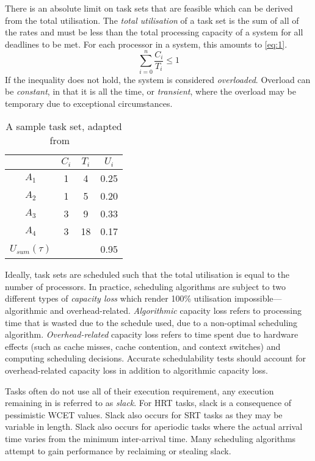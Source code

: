 There is an absolute limit on task sets that are feasible which can be derived from the total
utilisation. 
The \emph{total utilisation} of a task set is the sum of all of the rates and must be less than the
total processing capacity of a system for all deadlines to be met.
For each processor in a system, this amounts to \cref{eq:1}.
\begin{equation}
    \label{eq:1}
	\sum\limits_{i=0}^n \dfrac{C_{i}}{T_{i}} \leq 1
\end{equation}
If the inequality does not hold, the system is considered \emph{overloaded}. Overload
can be \emph{constant}, in that it is all the time, or \emph{transient}, where the overload may be
temporary due to exceptional circumstances.

\begin{table}
    \centering
    \begin{tabular}{cccc} \toprule
        & \emph{$C_{i}$} & $T_{i}$ & $U_{i} $ \\ \midrule
			$ A_{1}$ & 1 & 4 & 0.25 \\
			$ A_{2}$ & 1 & 5 & 0.20 \\
			$ A_{3}$ & 3 & 9 & 0.33 \\
			$ A_{4}$ & 3 & 18 & 0.17  \\\midrule 
	$ U_{sum}(\tau)$ & &  & 0.95 \\ \bottomrule
	\end{tabular}
	\caption{A sample task set, adapted from ~\citep{Brandenburg:phd}}
	\label{tab:example_task_set}
\end{table}

Ideally, task sets are scheduled such that the total utilisation is equal to the number of
processors.  In practice, scheduling algorithms are subject to two different types of \emph{capacity
loss} which render 100\% utilisation impossible---algorithmic and overhead-related.
\emph{Algorithmic} capacity loss refers to processing time that is wasted due to the schedule used,
due to a non-optimal scheduling algorithm.  \emph{Overhead-related} capacity loss refers to time
spent due to hardware effects (such as cache misses, cache contention, and context switches) and
computing scheduling decisions.  Accurate schedulability tests should account for overhead-related
capacity loss in addition to algorithmic capacity loss.

Tasks often do not use all of their execution requirement, any execution remaining in is referred to
as \emph{slack}. For \gls{HRT} tasks, slack is a consequence of pessimistic \gls{WCET} values. Slack
also occurs for \gls{SRT} tasks as they may be variable in length. Slack also occurs for aperiodic
tasks where the actual arrival time varies from the minimum inter-arrival time. Many scheduling algorithms
attempt to gain performance by reclaiming or stealing slack.

